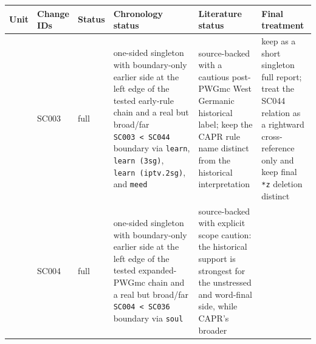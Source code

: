 \documentclass[
  british,
  a4paper,
]{article}
\newcounter{none} %
\begin{document}
{\def\LTcaptype{none} %
\begin{longtable}[]{@{}
  >{\raggedright\arraybackslash}p{}
  >{\raggedright\arraybackslash}p{}
  >{\raggedright\arraybackslash}p{}
  >{\raggedright\arraybackslash}p{}
  >{\raggedright\arraybackslash}p{}
  >{\raggedright\arraybackslash}p{}@{}}
\toprule\noalign{}
\begin{minipage}[b]{\linewidth}\raggedright
Unit
\end{minipage} & \begin{minipage}[b]{\linewidth}\raggedright
Change IDs
\end{minipage} & \begin{minipage}[b]{\linewidth}\raggedright
Status
\end{minipage} & \begin{minipage}[b]{\linewidth}\raggedright
Chronology status
\end{minipage} & \begin{minipage}[b]{\linewidth}\raggedright
Literature status
\end{minipage} & \begin{minipage}[b]{\linewidth}\raggedright
Final treatment
\end{minipage} \\
\midrule\noalign{}
\endhead
\bottomrule\noalign{}
\endlastfoot
003 & SC003 & full & one-sided singleton with boundary-only earlier side
at the left edge of the tested early-rule chain and a real but broad/far
\texttt{SC003\ \textless{}\ SC044} boundary via \texttt{learn},
\texttt{learn\ (3sg)}, \texttt{learn\ (iptv.2sg)}, and \texttt{meed} &
source-backed with a cautious post-PWGmc West Germanic historical label;
keep the CAPR rule name distinct from the historical interpretation &
keep as a short singleton full report; treat the SC044 relation as a
rightward cross-reference only and keep final \texttt{*z} deletion
distinct \\
004 & SC004 & full & one-sided singleton with boundary-only earlier side
at the left edge of the tested expanded-PWGmc chain and a real but
broad/far \texttt{SC004\ \textless{}\ SC036} boundary via \texttt{soul}
& source-backed with explicit scope caution: the historical support is
strongest for the unstressed and word-final side, while CAPR's broader

\end{longtable}}
\end{document}
